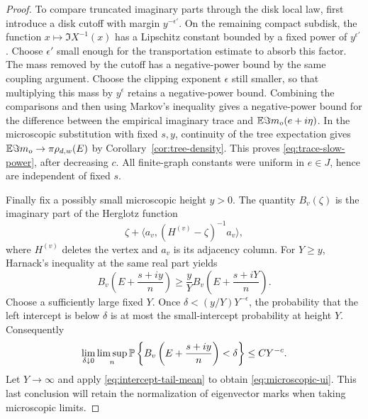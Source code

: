 \begin{proof}
To compare truncated imaginary parts through the disk local law,
first introduce a disk cutoff with margin $y^{-\epsilon'}$.
On the remaining compact subdisk, the function $x\mapsto\Im X^{-1}(x)$
has a Lipschitz constant bounded by a fixed power of $y^{\epsilon'}$.
Choose $\epsilon'$ small enough for the transportation estimate to
absorb this factor.  The mass removed by the cutoff has a negative-power
bound by the same coupling argument.  Choose the clipping exponent
$\epsilon$ still smaller, so that multiplying this mass by $y^\epsilon$
retains a negative-power bound.  Combining the comparisons and then
using Markov's inequality gives a negative-power bound for the
difference between the empirical imaginary trace and
$\mathbb E\Im m_o(e+i\eta)$.  In the microscopic substitution with fixed
$s,y$, continuity of the tree expectation gives
$\mathbb E\Im m_o\to\pi\rho_{d,w}(E)$ by
Corollary~\ref{cor:tree-density}.  This proves
\eqref{eq:trace-slow-power}, after decreasing $c$.  All finite-graph
constants were uniform in $e\in J$, hence are independent of fixed $s$.

Finally fix a possibly small microscopic height $y>0$.
The quantity $B_v(\zeta)$ is the imaginary part of the Herglotz function
\[
 \zeta+\langle a_v,(H^{(v)}-\zeta)^{-1}a_v\rangle,
\]
where $H^{(v)}$ deletes the vertex and $a_v$ is its adjacency column.
For $Y\ge y$, Harnack's inequality at the same real part yields
\[
 B_v\left(E+\frac{s+iy}{n}\right)
 \ge\frac yY B_v\left(E+\frac{s+iY}{n}\right).
\]
Choose a sufficiently large fixed $Y$.  Once
$\delta<(y/Y)Y^{-\epsilon}$, the probability that the left intercept
is below $\delta$ is at most the small-intercept probability at height
$Y$.  Consequently
\[
 \lim_{\delta\downarrow0}\limsup_n
 \mathbb P\left\{B_v\left(E+\frac{s+iy}{n}\right)<\delta\right\}
 \le CY^{-c}.
\]
Let $Y\to\infty$ and apply \eqref{eq:intercept-tail-mean} to obtain
\eqref{eq:microscopic-ui}.  This last conclusion will retain the
normalization of eigenvector marks when taking microscopic limits.
\end{proof}
